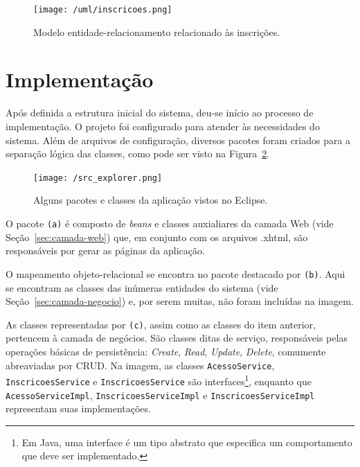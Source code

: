 \documentclass[
  10.5pt,				  %
	openright,			%
	twoside,			  %
  a5paper,
  chapter=TITLE,	%
	section=TITLE,	%
  hyphens,        %
	english,        %
	brazil          %
]{abntex2}
\begin{document}
\begin{landscape}
\begin{figure}[!ht]
  \caption{\label{fig:uml_classes2} Modelo entidade-relacionamento relacionado às inscrições. }
  \begin{center}
    \texttt{[image: /uml/inscricoes.png]}
  \end{center}
\end{figure}
\end{landscape}


\section{Implementação}

Após definida a estrutura inicial do sistema, deu-se início ao processo de implementação. O projeto foi configurado para atender às necessidades do sistema. Além de arquivos de configuração, diversos pacotes foram criados para a separação lógica das classes, como pode ser visto na Figura~\ref{fig:src_explorer}.

\begin{figure}[!ht]
  \caption{\label{fig:src_explorer} Alguns pacotes e classes da aplicação vistos no Eclipse. }
  \begin{center}
    \texttt{[image: /src\_explorer.png]}
  \end{center}
\end{figure}

O pacote \texttt{(a)} é composto de \emph{beans} e classes auxialiares da camada Web (vide Seção~\ref{sec:camada-web}) que, em conjunto com os arquivos .xhtml, são responsáveis por gerar as páginas da aplicação.

O mapeamento objeto-relacional se encontra no pacote destacado por \texttt{(b)}. Aqui se encontram as classes das inúmeras entidades do sistema (vide Seção~\ref{sec:camada-negocio}) e, por serem muitas, não foram incluídas na imagem.

As classes representadas por \texttt{(c)}, assim como as classes do item anterior, pertencem à camada de negócios. São classes ditas de serviço, responsáveis pelas operações básicas de persistência: \emph{Create}, \emph{Read}, \emph{Update}, \emph{Delete}, comumente abreaviadas por CRUD. Na imagem, as classes \texttt{AcessoService}, \texttt{InscricoesService} e \texttt{InscricoesService} são interfaces\footnote{Em Java, uma interface é um tipo abstrato que especifica um comportamento que deve ser implementado.}, enquanto que \texttt{AcessoServiceImpl}, \texttt{InscricoesServiceImpl} e \texttt{InscricoesServiceImpl} representam suas implementações.
\end{document}
